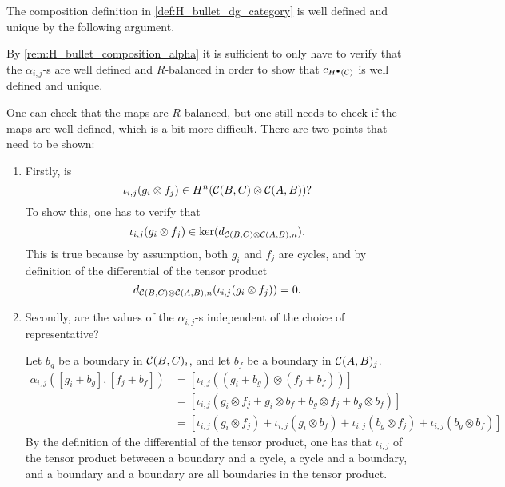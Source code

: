 \begin{remark}
    \label{rem:composition_in_H_bullet_is_well_defined}
    The composition definition in \autoref{def:H_bullet_dg_category} is well defined and unique by the following argument.

    By \autoref{rem:H_bullet_composition_alpha} it is sufficient to only have to verify that the \( \alpha_{i, j} \)-s are well defined and \( R \)-balanced in order to show that \( c_{H^\bullet({\mathcal{C}})} \) is well defined and unique.

    One can check that the maps are \( R \)-balanced, but one still needs to check if the maps are well defined, which is a bit more difficult. There are two points that need to be shown:
    \begin{enumerate}
        \item {
            Firstly, is
            \[
                \iota_{i, j}(g_i \otimes f_j) \in H^n({\mathcal{C}}(B, C) \otimes {\mathcal{C}}(A, B))?
            \]
            To show this, one has to verify that
            \[
                \iota_{i, j}(g_i \otimes f_j) \in \ker(d_{{\mathcal{C}}(B, C) \otimes {\mathcal{C}}(A, B), n}).
            \]
            This is true because by assumption, both \( g_i \) and \( f_j \) are cycles, and by definition of the differential of the tensor product
            \[
                d_{{\mathcal{C}}(B, C) \otimes {\mathcal{C}}(A, B), n}(\iota_{i, j}(g_i \otimes f_j)) = 0.
            \]
        }
        \item {
            Secondly, are the values of the \( \alpha_{i, j} \)-s independent of the choice of representative?

            Let \( b_g \) be a boundary in \( {\mathcal{C}}(B, C)_i \), and let \( b_f \) be a boundary in \( {\mathcal{C}}(A, B)_j \).
            \begin{align*}
                \alpha_{i, j}([g_i + b_g], [f_j + b_f]) &= [\iota_{i, j}((g_i + b_g) \otimes (f_j + b_f))] \\
                &= [\iota_{i, j}(g_i \otimes f_j + g_i \otimes b_f + b_g \otimes f_j + b_g \otimes b_f)] \\
                &= [\iota_{i, j}(g_i \otimes f_j) + \iota_{i, j}(g_i \otimes b_f) + \iota_{i, j}(b_g \otimes f_j) + \iota_ {i, j}(b_g \otimes b_f)]
            \end{align*}
            By the definition of the differential of the tensor product, one has that \( \iota_{i, j} \) of the tensor product betweeen a boundary and a cycle, a cycle and a boundary, and a boundary and a boundary are all boundaries in the tensor product.

}
\end{enumerate}
\end{remark}
